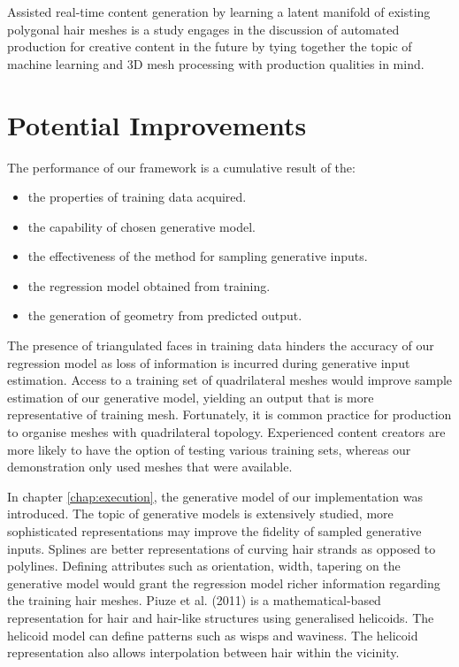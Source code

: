 \documentclass[ %
author={Dillon Keith Diep},
supervisor={Dr. Carl Henrik Ek},
degree={MEng},
title={ART-CG Hair:},
subtitle={Assisted Real-time Content Generation of Stylised Virtual Hair},
type={Research},
year={2017} ]{dissertation}
\begin{document}
Assisted real-time content generation by learning a latent manifold of existing polygonal hair meshes is a study engages in the discussion of automated production for creative content in the future by tying together the topic of machine learning and 3D mesh processing with production qualities in mind. 

\section{Potential Improvements}
The performance of our framework is a cumulative result of the: 
\begin{itemize}
	\item the properties of training data acquired.
	\item the capability of chosen generative model.
	\item the effectiveness of the method for sampling generative inputs.
	\item the regression model obtained from training.
	\item the generation of geometry from predicted output.
\end{itemize}

The presence of triangulated faces in training data hinders the accuracy of our regression model as loss of information is incurred during generative input estimation. Access to a training set of quadrilateral meshes would improve sample estimation of our generative model, yielding an output that is more representative of training mesh. Fortunately, it is common practice for production to organise meshes with quadrilateral topology. Experienced content creators are more likely to have the option of testing various training sets, whereas our demonstration only used meshes that were available.

In chapter \ref{chap:execution}, the generative model of our implementation was introduced. The topic of generative models is extensively studied, more sophisticated representations may improve the fidelity of sampled generative inputs. Splines are better representations of curving hair strands as opposed to polylines. Defining attributes such as orientation, width, tapering on the generative model would grant the regression model richer information regarding the training hair meshes. Piuze et al. (2011) \cite{helicoidhair} is a mathematical-based representation for hair and hair-like structures using generalised helicoids. The helicoid model can define patterns such as wisps and waviness. The helicoid representation also allows interpolation between hair within the vicinity.
\end{document}
